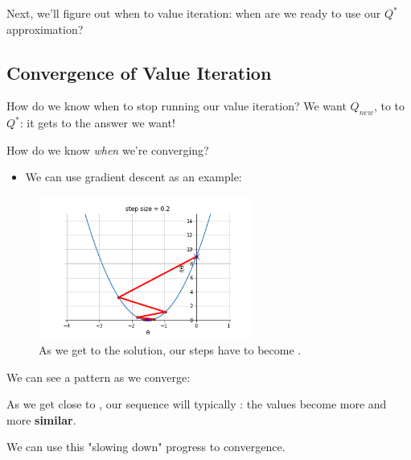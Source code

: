 
        Next, we'll figure out when to  value iteration: when are we ready to use our $Q^*$ approximation?


    \pagebreak

    \subsection{Convergence of Value Iteration}

        How do we know when to stop running our value iteration? We want $Q_{new}$, to  to $Q^*$: it gets  to the answer we want!

        How do we know \textit{when} we're converging?

        \begin{itemize}
            \item We can use gradient descent as an example:
        \end{itemize}

        \begin{figure}[H]
            \centering
            \includegraphics[width=70mm,scale=0.5]{images/gradient_descent_images/good_converge_oscillate.png}

            \caption*{As we get  to the solution, our steps have to become . }   
        \end{figure}

        We can see a pattern as we converge:\\

        \begin{concept}
            As we get close to , our sequence will typically : the values become more and more \textbf{similar}.

            We can use this "slowing down" progress to  convergence.
        \end{concept}
        
